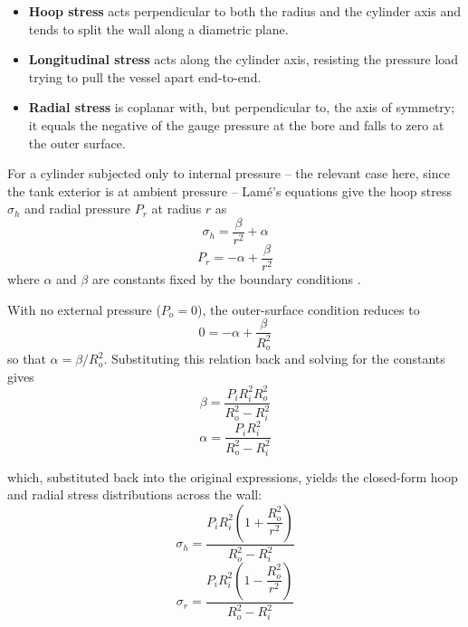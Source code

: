 \documentclass[conference]{IEEEtran}
\begin{document}
\begin{itemize}
    \item \textbf{Hoop stress} acts perpendicular to both the radius and the cylinder axis and tends to split the wall along a diametric plane.
    \item \textbf{Longitudinal stress} acts along the cylinder axis, resisting the pressure load trying to pull the vessel apart end-to-end.
    \item \textbf{Radial stress} is coplanar with, but perpendicular to, the axis of symmetry; it equals the negative of the gauge pressure at the bore and falls to zero at the outer surface.
\end{itemize}

For a cylinder subjected only to internal pressure -- the relevant case here, since the tank exterior is at ambient pressure -- Lam\'e's equations give the hoop stress $\sigma_h$ and radial pressure $P_r$ at radius $r$ as
\begin{equation}
    \sigma_h = \frac{\beta}{r^2} + \alpha
\end{equation}
\begin{equation}
    P_r = -\alpha + \frac{\beta}{r^2}
\end{equation}
where $\alpha$ and $\beta$ are constants fixed by the boundary conditions \cite{boresi2003}.

With no external pressure ($P_o = 0$), the outer-surface condition reduces to
\begin{equation}
    0 = -\alpha + \frac{\beta}{R_o^2}
\end{equation}
so that $\alpha = \beta / R_o^2$. Substituting this relation back and solving for the constants gives
\begin{equation}
    \beta = \frac{P_i R_i^2 R_o^2}{R_o^2 - R_i^2}
\end{equation}
\begin{equation}
    \alpha = \frac{P_i R_i^2}{R_o^2 - R_i^2}
\end{equation}

which, substituted back into the original expressions, yields the closed-form hoop and radial stress distributions across the wall:
\begin{equation}
    \sigma_h = \frac{P_i R_i^2 \left(1 + \dfrac{R_o^2}{r^2}\right)}{R_o^2 - R_i^2}
\end{equation}
\begin{equation}
    \sigma_r = \frac{P_i R_i^2 \left(1 - \dfrac{R_o^2}{r^2}\right)}{R_o^2 - R_i^2}
\end{equation}
\end{document}
